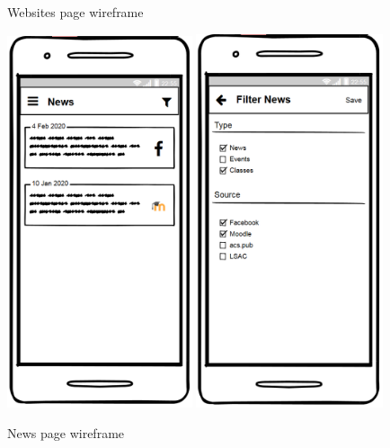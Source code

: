\begin{figure}[!ht]
\begin{minipage}[b]{0.26\textwidth}
        \caption{Websites page wireframe}
        \label{4:fig:balsamiq_websites}
    \end{minipage}
    \hfill
    \begin{minipage}[b]{0.54\textwidth}
        \captionsetup{justification=centering}
        \includegraphics[width=0.485\textwidth]{figures/app/balsamiq/news.png}
        \includegraphics[width=0.49\textwidth]{figures/app/balsamiq/filter_news.png}
        \caption{News page wireframe\newline}
        \label{4:fig:balsamiq_news}
    \end{minipage}
\end{figure}

